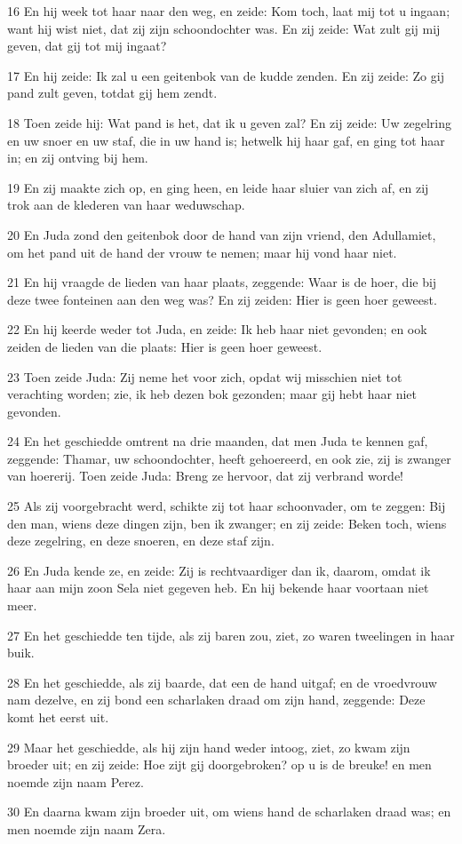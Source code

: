 \par 16 En hij week tot haar naar den weg, en zeide: Kom toch, laat mij tot u ingaan; want hij wist niet, dat zij zijn schoondochter was. En zij zeide: Wat zult gij mij geven, dat gij tot mij ingaat?
\par 17 En hij zeide: Ik zal u een geitenbok van de kudde zenden. En zij zeide: Zo gij pand zult geven, totdat gij hem zendt.
\par 18 Toen zeide hij: Wat pand is het, dat ik u geven zal? En zij zeide: Uw zegelring en uw snoer en uw staf, die in uw hand is; hetwelk hij haar gaf, en ging tot haar in; en zij ontving bij hem.
\par 19 En zij maakte zich op, en ging heen, en leide haar sluier van zich af, en zij trok aan de klederen van haar weduwschap.
\par 20 En Juda zond den geitenbok door de hand van zijn vriend, den Adullamiet, om het pand uit de hand der vrouw te nemen; maar hij vond haar niet.
\par 21 En hij vraagde de lieden van haar plaats, zeggende: Waar is de hoer, die bij deze twee fonteinen aan den weg was? En zij zeiden: Hier is geen hoer geweest.
\par 22 En hij keerde weder tot Juda, en zeide: Ik heb haar niet gevonden; en ook zeiden de lieden van die plaats: Hier is geen hoer geweest.
\par 23 Toen zeide Juda: Zij neme het voor zich, opdat wij misschien niet tot verachting worden; zie, ik heb dezen bok gezonden; maar gij hebt haar niet gevonden.
\par 24 En het geschiedde omtrent na drie maanden, dat men Juda te kennen gaf, zeggende: Thamar, uw schoondochter, heeft gehoereerd, en ook zie, zij is zwanger van hoererij. Toen zeide Juda: Breng ze hervoor, dat zij verbrand worde!
\par 25 Als zij voorgebracht werd, schikte zij tot haar schoonvader, om te zeggen: Bij den man, wiens deze dingen zijn, ben ik zwanger; en zij zeide: Beken toch, wiens deze zegelring, en deze snoeren, en deze staf zijn.
\par 26 En Juda kende ze, en zeide: Zij is rechtvaardiger dan ik, daarom, omdat ik haar aan mijn zoon Sela niet gegeven heb. En hij bekende haar voortaan niet meer.
\par 27 En het geschiedde ten tijde, als zij baren zou, ziet, zo waren tweelingen in haar buik.
\par 28 En het geschiedde, als zij baarde, dat een de hand uitgaf; en de vroedvrouw nam dezelve, en zij bond een scharlaken draad om zijn hand, zeggende: Deze komt het eerst uit.
\par 29 Maar het geschiedde, als hij zijn hand weder intoog, ziet, zo kwam zijn broeder uit; en zij zeide: Hoe zijt gij doorgebroken? op u is de breuke! en men noemde zijn naam Perez.
\par 30 En daarna kwam zijn broeder uit, om wiens hand de scharlaken draad was; en men noemde zijn naam Zera.

